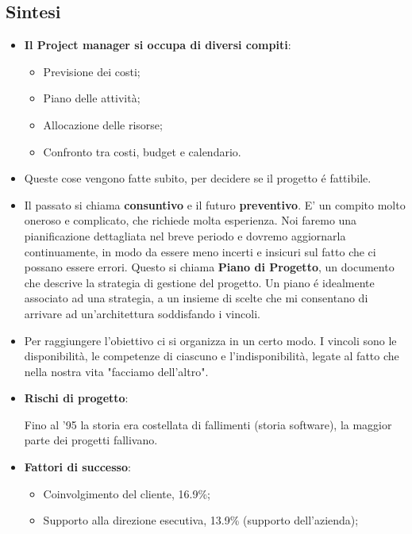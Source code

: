 \documentclass[a4paper,10pt] {article}
\begin{document}
\begin{itemize}
\subsection{Sintesi}
\begin{itemize}
	
	\item \textbf{Il Project manager si occupa di diversi compiti}:
	\begin{itemize}
		\item Previsione dei costi;
		\item Piano delle attività;
		\item Allocazione delle risorse;
		\item Confronto tra costi, budget e calendario.
	\end{itemize}
	\item Queste cose vengono fatte subito, per decidere se il progetto é 
	fattibile. 
	\item Il passato si chiama \textbf{consuntivo} e il futuro 
	\textbf{preventivo}. E' un compito molto oneroso e complicato, che richiede 
	molta esperienza. Noi faremo	una pianificazione dettagliata nel breve 
	periodo e dovremo aggiornarla continuamente, in modo da essere meno incerti 
	e insicuri sul fatto che ci possano essere errori. Questo si chiama 
	\textbf{Piano di Progetto}, un documento che descrive la strategia di 
	gestione del progetto. Un piano é idealmente associato ad una strategia, a 
	un insieme di scelte che mi consentano di arrivare ad un'architettura 
	soddisfando i vincoli.
	
	\item Per raggiungere l'obiettivo ci si organizza in un certo modo. I 
	vincoli sono le disponibilità, le competenze di ciascuno e 
	l'indisponibilità, legate al fatto che nella nostra vita "facciamo 
	dell'altro".

	
	
	\item \textbf{Rischi di progetto}:
	
	Fino al '95 la storia era costellata di fallimenti (storia software), la 
	maggior parte dei progetti fallivano.
	
    \item \textbf{Fattori di successo}:
    \begin{itemize}

	\item Coinvolgimento del cliente, 16.9\%;
	
	\item Supporto alla direzione esecutiva, 13.9\% (supporto dell'azienda);
	

\end{itemize}
\end{itemize}
\end{itemize}
\end{document}
